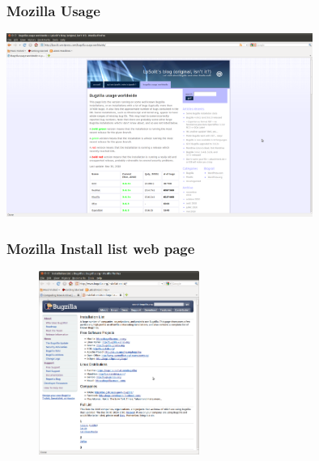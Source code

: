 \documentclass{beamer}
\begin{document}
\begin{frame}
\frametitle{Mozilla Usage}
\begin{center}
 \includegraphics[height=6cm]{figs/Bugzilla_usage_worldwide.png}
\begin{figure}
\end{figure}
\end{center}
\end{frame}


\begin{frame}
\frametitle{Mozilla Install list web page}
\begin{center}
\begin{figure}
 \includegraphics[height=6cm]{figs/Bugzilla_Install_List.png}
\end{figure}
\end{center}
\end{frame}

\end{document}
